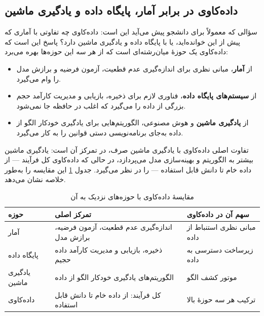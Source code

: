 \subsection{داده‌کاوی در برابر آمار، پایگاه داده و یادگیری ماشین}

سؤالی که معمولاً برای دانشجو پیش می‌آید این است: داده‌کاوی چه تفاوتی با آماری که
پیش از این خوانده‌اید، یا با پایگاه داده و یادگیری ماشین دارد؟ پاسخ این است که
داده‌کاوی یک حوزهٔ میان‌رشته‌ای است که از هر سه این حوزه‌ها بهره می‌برد:

\begin{itemize}
    \item از \textbf{آمار}، مبانی نظری برای اندازه‌گیری عدم قطعیت، آزمون فرضیه و
          برازش مدل را وام می‌گیرد.
    \item از \textbf{سیستم‌های پایگاه داده}، فناوری لازم برای ذخیره، بازیابی و
          مدیریت کارآمد حجم بزرگی از داده را می‌گیرد که اغلب در حافظه جا نمی‌شود.
    \item از \textbf{یادگیری ماشین} و هوش مصنوعی، الگوریتم‌هایی برای یادگیری خودکار
          الگو از داده به‌جای برنامه‌نویسی دستی قوانین را به کار می‌گیرد.
\end{itemize}

تفاوت اصلی داده‌کاوی با یادگیری ماشین صرف، در تمرکز آن است: یادگیری ماشین بیشتر
به الگوریتم و بهینه‌سازی مدل می‌پردازد، در حالی که داده‌کاوی کل فرآیند — از
داده خام تا دانش قابل استفاده — را در نظر می‌گیرد. جدول \ref{tab:dm-comparison}
این مقایسه را به‌طور خلاصه نشان می‌دهد.

\begin{table}[htbp]
\centering
\caption{مقایسهٔ داده‌کاوی با حوزه‌های نزدیک به آن}
\label{tab:dm-comparison}
\begin{tabular}{@{}p{2.6cm}p{5.8cm}p{4.6cm}@{}}
\toprule
\textbf{حوزه} & \textbf{تمرکز اصلی} & \textbf{سهم آن در داده‌کاوی} \\
\midrule
آمار & اندازه‌گیری عدم قطعیت، آزمون فرضیه، برازش مدل & مبانی نظری استنباط از داده \\
\addlinespace
پایگاه داده & ذخیره، بازیابی و مدیریت کارآمد داده حجیم & زیرساخت دسترسی به داده \\
\addlinespace
یادگیری ماشین & الگوریتم‌های یادگیری خودکار الگو از داده & موتور کشف الگو \\
\addlinespace
داده‌کاوی & کل فرآیند: از داده خام تا دانش قابل استفاده & ترکیب هر سه حوزهٔ بالا \\
\bottomrule
\end{tabular}
\end{table}

